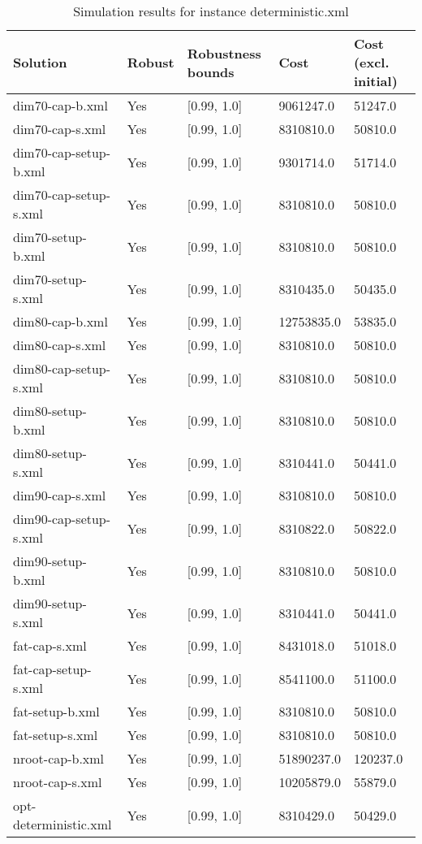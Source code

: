 \begin{table}[!hbp]
\label{tab:instance5_results}
\begin{tabular}{lllll}
\hline
Solution 	& Robust  	& Robustness bounds 	& Cost 	& Cost (excl. initial) \\
\hline
\hline
dim70-cap-b.xml 	& Yes 	&  [0.99, 1.0] 	& 9061247.0 	& 51247.0\\
dim70-cap-s.xml 	& Yes 	&  [0.99, 1.0] 	& 8310810.0 	& 50810.0\\
dim70-cap-setup-b.xml 	& Yes 	&  [0.99, 1.0] 	& 9301714.0 	& 51714.0\\
dim70-cap-setup-s.xml 	& Yes 	&  [0.99, 1.0] 	& 8310810.0 	& 50810.0\\
dim70-setup-b.xml 	& Yes 	&  [0.99, 1.0] 	& 8310810.0 	& 50810.0\\
dim70-setup-s.xml 	& Yes 	&  [0.99, 1.0] 	& 8310435.0 	& 50435.0\\
dim80-cap-b.xml 	& Yes 	&  [0.99, 1.0] 	& 12753835.0 	& 53835.0\\
dim80-cap-s.xml 	& Yes 	&  [0.99, 1.0] 	& 8310810.0 	& 50810.0\\
dim80-cap-setup-s.xml 	& Yes 	&  [0.99, 1.0] 	& 8310810.0 	& 50810.0\\
dim80-setup-b.xml 	& Yes 	&  [0.99, 1.0] 	& 8310810.0 	& 50810.0\\
dim80-setup-s.xml 	& Yes 	&  [0.99, 1.0] 	& 8310441.0 	& 50441.0\\
dim90-cap-s.xml 	& Yes 	&  [0.99, 1.0] 	& 8310810.0 	& 50810.0\\
dim90-cap-setup-s.xml 	& Yes 	&  [0.99, 1.0] 	& 8310822.0 	& 50822.0\\
dim90-setup-b.xml 	& Yes 	&  [0.99, 1.0] 	& 8310810.0 	& 50810.0\\
dim90-setup-s.xml 	& Yes 	&  [0.99, 1.0] 	& 8310441.0 	& 50441.0\\
fat-cap-s.xml 	& Yes 	&  [0.99, 1.0] 	& 8431018.0 	& 51018.0\\
fat-cap-setup-s.xml 	& Yes 	&  [0.99, 1.0] 	& 8541100.0 	& 51100.0\\
fat-setup-b.xml 	& Yes 	&  [0.99, 1.0] 	& 8310810.0 	& 50810.0\\
fat-setup-s.xml 	& Yes 	&  [0.99, 1.0] 	& 8310810.0 	& 50810.0\\
nroot-cap-b.xml 	& Yes 	&  [0.99, 1.0] 	& 51890237.0 	& 120237.0\\
nroot-cap-s.xml 	& Yes 	&  [0.99, 1.0] 	& 10205879.0 	& 55879.0\\
opt-deterministic.xml 	& Yes 	&  [0.99, 1.0] 	& 8310429.0 	& 50429.0\\
\hline
\end{tabular}
\caption{Simulation results for instance deterministic.xml}
\end{table}


